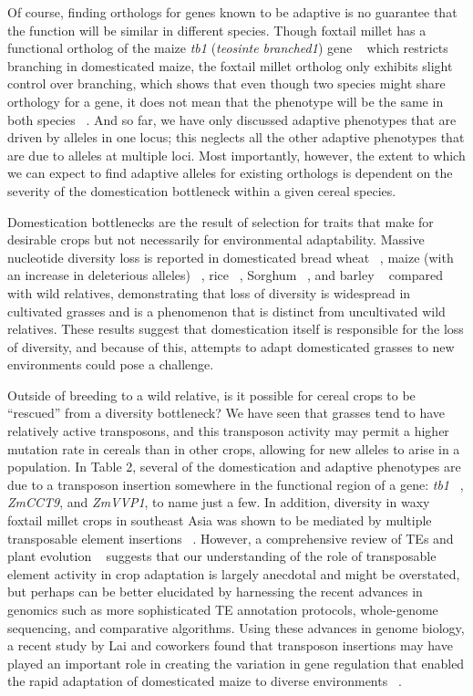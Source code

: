 \documentclass[12pt]{article}
\begin{document}
Of course, finding orthologs for genes known to be adaptive is no guarantee that the function will be similar in different species. Though foxtail millet has a functional ortholog of the maize \textit{tb1} (\textit{teosinte branched1}) gene ~\citep{pmid9087405}  which restricts branching in domesticated maize, the foxtail millet ortholog only exhibits slight control over branching, which shows that even though two species might share orthology for a gene, it does not mean that the phenotype will be the same in both species ~\citep{Doust2004}. And so far, we have only discussed adaptive phenotypes that are driven by alleles in one locus; this neglects all the other adaptive phenotypes that are due to alleles at multiple loci.  Most importantly, however, the extent to which we can expect to find adaptive alleles for existing orthologs is dependent on the severity of the domestication bottleneck within a given cereal species.

Domestication bottlenecks are the result of selection for traits that make for desirable crops but not necessarily for environmental adaptability. Massive nucleotide diversity loss is reported in domesticated bread wheat ~\citep{Haudry2007}, maize (with an increase in deleterious alleles) ~\citep{pmid9539756, Wang2017}, rice ~\citep{pmid17218640}, Sorghum ~\citep{Hamblin2006}, and barley ~\citep{Kilian2006} compared with wild relatives, demonstrating that loss of diversity is widespread in cultivated grasses and is a phenomenon that is distinct from uncultivated wild relatives. These results suggest that domestication itself is responsible for the loss of diversity, and because of this, attempts to adapt domesticated grasses to new environments could pose a challenge.  

Outside of breeding to a wild relative, is it possible for cereal crops to be “rescued” from a diversity bottleneck? We have seen that grasses tend to have relatively active transposons, and this transposon activity may permit a higher mutation rate in cereals than in other crops, allowing for new alleles to arise in a population.  In Table 2, several of the domestication and adaptive phenotypes are due to a transposon insertion somewhere in the functional region of a gene: \textit{tb1} ~\citep{Studer2011}, \textit{ZmCCT9}, and \textit{ZmVVP1}, to name just a few. In addition, diversity in waxy foxtail millet crops in southeast Asia was shown to be mediated by multiple transposable element insertions ~\citep{Kawase2005}. However, a comprehensive review of TEs and plant evolution ~\citep{Lisch2001} suggests that our understanding of the role of transposable element activity in crop adaptation is largely anecdotal and might be overstated, but perhaps can be better elucidated by harnessing the recent advances in genomics such as more sophisticated TE annotation protocols, whole-genome sequencing, and comparative algorithms.  Using these advances in genome biology, a recent study by Lai and coworkers found that transposon insertions may have played an important role in creating the variation in gene regulation that enabled the rapid adaptation of domesticated maize to diverse environments ~\citep{Lai2017}. 
\end{document}
